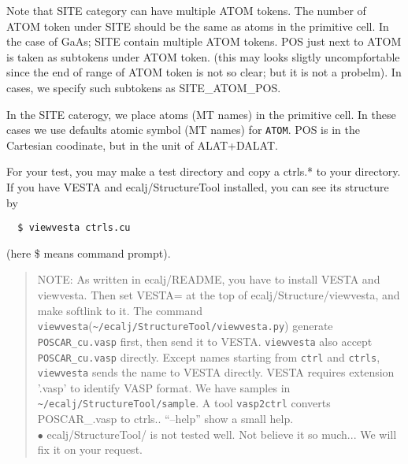 \documentclass[a4paper,10pt,epsf,fleqn]{article}
\begin{document}
Note that SITE category can have multiple ATOM tokens. The number of
ATOM token under SITE should be  the same as atoms in the primitive cell.
In the case of GaAs; SITE contain multiple ATOM tokens.
POS just next to ATOM is taken as subtokens under ATOM token. 
(this may looks sligtly uncompfortable since the end of range of ATOM
 token is not so clear; but it is not a probelm).
In cases, we specify such subtokens as SITE\_ATOM\_POS.

In the SITE caterogy, we place atoms (MT names) in the primitive cell.
In these cases we use defaults atomic symbol (MT names) for \verb+ATOM+.
POS is in the Cartesian coodinate, but in the unit of ALAT+DALAT.

For your test, you may make a test directory and copy a ctrls.* to your directory.
If you have VESTA and ecalj/StructureTool installed, you can see its structure by 
\begin{verbatim}
  $ viewvesta ctrls.cu
\end{verbatim}
(here \$ means command prompt).
\begin{quote}
NOTE: As written in ecalj/README, you have to install VESTA and viewvesta. 
Then set VESTA= at the top of ecalj/Structure/viewvesta, and make softlink to it.
The command \verb+viewvesta+(\verb+~/ecalj/StructureTool/viewvesta.py+)
generate \verb+POSCAR_cu.vasp+ first, then send it to VESTA.
\verb+viewvesta+ also accept \verb+POSCAR_cu.vasp+ directly.
Except names starting from \verb+ctrl+ and \verb+ctrls+,
\verb+viewvesta+ sends the name to VESTA directly. 
VESTA requires extension '.vasp' to identify VASP format.
We have samples in \verb+~/ecalj/StructureTool/sample+.
A tool \verb+vasp2ctrl+ converts POSCAR\_\*.vasp to ctrls.\*.
``--help'' show a small help. \\
$\bullet$ ecalj/StructureTool/ is not tested well. Not believe it so
much... We will fix it on your request.
\end{quote}
\end{document}
